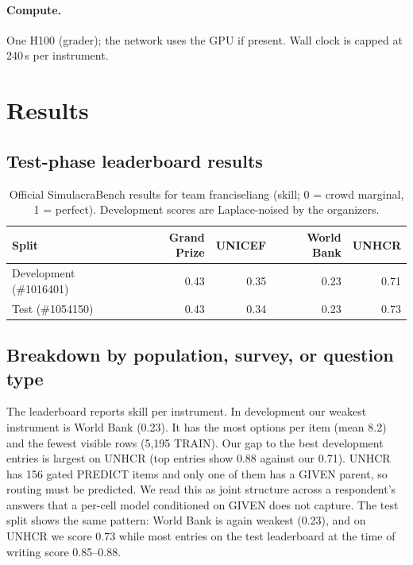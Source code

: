 \documentclass{article}
\newcommand{\teamid}{franciseliang}
\begin{document}
\paragraph{Compute.} One H100 (grader); the network uses the GPU if present. Wall clock is capped at 240\,s per instrument.

\section{Results}
\label{sec:results}

\subsection{Test-phase leaderboard results}

\begin{table}[h]
  \centering
  \caption{Official SimulacraBench results for team \teamid{} (skill; 0 = crowd marginal, 1 = perfect). Development scores are Laplace-noised by the organizers.}
  \label{tab:results}
  \begin{tabular}{lrrrr}
    \toprule
    Split & Grand Prize & UNICEF & World Bank & UNHCR \\
    \midrule
    Development (\#1016401) & 0.43 & 0.35 & 0.23 & 0.71 \\
    Test (\#1054150) & 0.43 & 0.34 & 0.23 & 0.73 \\
    \bottomrule
  \end{tabular}
\end{table}

\subsection{Breakdown by population, survey, or question type}
The leaderboard reports skill per instrument. In development our weakest instrument is World Bank (0.23). It has the most options per item (mean 8.2) and the fewest visible rows (5,195 TRAIN). Our gap to the best development entries is largest on UNHCR (top entries show 0.88 against our 0.71). UNHCR has 156 gated PREDICT items and only one of them has a GIVEN parent, so routing must be predicted. We read this as joint structure across a respondent's answers that a per-cell model conditioned on GIVEN does not capture. The test split shows the same pattern: World Bank is again weakest (0.23), and on UNHCR we score 0.73 while most entries on the test leaderboard at the time of writing score 0.85--0.88.
\end{document}

